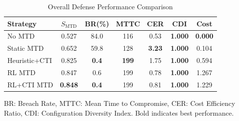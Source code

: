 \begin{table}[!t]
\centering
\caption{Overall Defense Performance Comparison}
\label{tab:overall_comparison}
\renewcommand{\arraystretch}{1.1}
\begin{tabular}{@{}lcccccc@{}}
\toprule
\textbf{Strategy} & $S_{\mathrm{MTD}}$ & \textbf{BR(\%)} & \textbf{MTTC} & \textbf{CER} & \textbf{CDI} & \textbf{Cost} \\
\midrule
No MTD & 0.527 & 84.0 & 116 & 0.53 & \textbf{1.000} & \textbf{0.000} \\
Static MTD & 0.652 & 59.8 & 128 & \textbf{3.23} & \textbf{1.000} & 0.104 \\
Heuristic+CTI & 0.825 & \textbf{0.4} & \textbf{199} & 1.75 & \textbf{1.000} & 0.594 \\
RL MTD & 0.847 & 0.6 & 199 & 0.78 & \textbf{1.000} & 1.267 \\
RL+CTI MTD & \textbf{0.848} & \textbf{0.4} & 199 & 0.81 & \textbf{1.000} & 1.229 \\
\bottomrule
\end{tabular}
\vspace{1mm}
\footnotesize{BR: Breach Rate, MTTC: Mean Time to Compromise, CER: Cost Efficiency Ratio, CDI: Configuration Diversity Index. Bold indicates best performance.}
\end{table}
